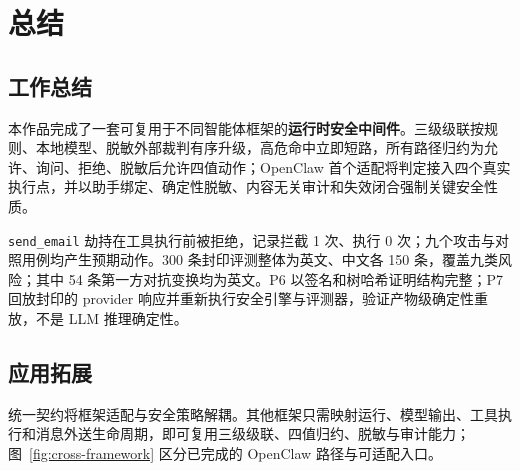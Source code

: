 \section{总结}

\subsection{工作总结}

本作品完成了一套可复用于不同智能体框架的\textbf{运行时安全中间件}。三级级联按规则、本地模型、脱敏外部裁判有序升级，高危命中立即短路，所有路径归约为允许、询问、拒绝、脱敏后允许四值动作；OpenClaw 首个适配将判定接入四个真实执行点，并以助手绑定、确定性脱敏、内容无关审计和失效闭合强制关键安全性质。

\verb|send_email| 劫持在工具执行前被拒绝，记录拦截 1 次、执行 0 次；九个攻击与对照用例均产生预期动作。300 条封印评测整体为英文、中文各 150 条，覆盖九类风险；其中 54 条第一方对抗变换均为英文。P6 以签名和树哈希证明结构完整；P7 回放封印的 provider 响应并重新执行安全引擎与评测器，验证产物级确定性重放，不是 LLM 推理确定性。

\subsection{应用拓展}

统一契约将框架适配与安全策略解耦。其他框架只需映射运行、模型输出、工具执行和消息外送生命周期，即可复用三级级联、四值归约、脱敏与审计能力；图~\ref{fig:cross-framework} 区分已完成的 OpenClaw 路径与可适配入口。

